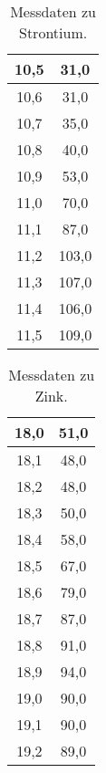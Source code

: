 \begin{table}
    \centering
    \caption{Messdaten zu Strontium.}
    \label{tab:Strontium}
    \begin{tabular}{c c}
        \toprule
         10,5 &  31,0 \\
        \midrule
         10,6 &  31,0 \\
         10,7 &  35,0 \\
         10,8 &  40,0 \\
         10,9 &  53,0 \\
         11,0 &  70,0 \\
         11,1 &  87,0 \\
         11,2 & 103,0 \\
         11,3 & 107,0 \\
         11,4 & 106,0 \\
         11,5 & 109,0 \\
        \bottomrule
        \end{tabular}
\end{table}

\begin{table}
    \centering
    \caption{Messdaten zu Zink.}
    \label{tab:Zink}
    \begin{tabular}{c c}
        \toprule
         18,0 &  51,0 \\
        \midrule
         18,1 &  48,0 \\
         18,2 &  48,0 \\
         18,3 &  50,0 \\
         18,4 &  58,0 \\
         18,5 &  67,0 \\
         18,6 &  79,0 \\
         18,7 &  87,0 \\
         18,8 &  91,0 \\
         18,9 &  94,0 \\
         19,0 &  90,0 \\
         19,1 &  90,0 \\
         19,2 &  89,0 \\
        \bottomrule
        \end{tabular}
\end{table}

